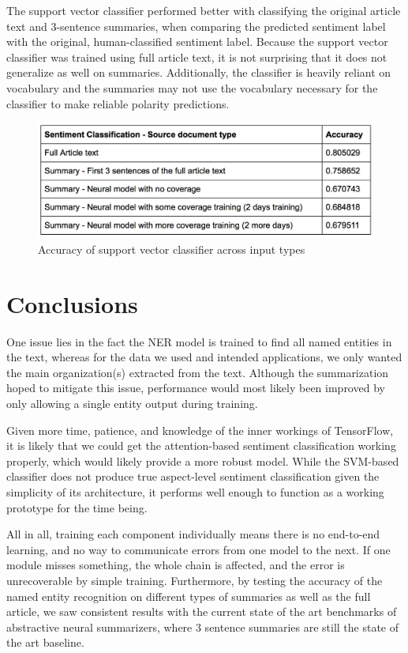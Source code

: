 \documentclass[12pt,a4paper]{article}
\begin{document}
The support vector classifier performed better with classifying the original article text and 3-sentence summaries, when comparing the predicted sentiment label with the original, human-classified sentiment label. Because the support vector classifier was trained using full article text, it is not surprising that it does not generalize as well on summaries. Additionally,  the classifier is heavily reliant on vocabulary and the summaries may not use the vocabulary necessary for the classifier to make reliable polarity predictions.
\begin{figure}[H]
  \centering
  \includegraphics[scale=0.6]{results_sentiment.png}
  \caption{Accuracy of support vector classifier across input types}
  \label{fig:network_performance}
\end{figure}



\section{\label{Conclusions}Conclusions}
One issue lies in the fact the NER model is trained to find all named entities in the text, whereas for the data we used and intended applications, we only wanted the main organization(s) extracted from the text. Although the summarization hoped to mitigate this issue, performance would most likely been improved by only allowing a single entity output during training.

Given more time, patience, and knowledge of the inner workings of TensorFlow, it is likely that we could get the attention-based sentiment classification working properly, which would likely provide a more robust model. While the SVM-based classifier does not produce true aspect-level sentiment classification given the simplicity of its architecture, it performs well enough to function as a working prototype for the time being.

All in all, training each component individually means there is no end-to-end learning, and no way to communicate errors from one model to the next. If one module misses something, the whole chain is affected, and the error is unrecoverable by simple training. Furthermore, by testing the accuracy of the named entity recognition on different types of summaries as well as the full article, we saw consistent results with the current state of the art benchmarks of abstractive neural summarizers, where 3 sentence summaries are still the state of the art baseline.
\\ \\
\end{document}
